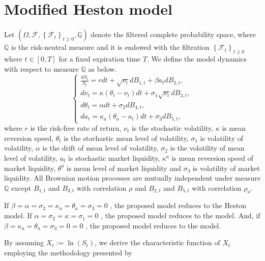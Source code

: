\documentclass[twoside]{article}
\begin{document}
\section{Modified Heston model}
Let $ \left( \Omega , \mathcal{F} , \left\lbrace \mathcal{F}_t\right\rbrace _{t \geq 0} , \mathbb{Q} \right) $ denote the filtered complete probability space, 
where $ \mathbb{Q} $ is the risk-neutral measure and it is endowed with the filtration $ \left\lbrace \mathcal{F}_t\right\rbrace _{t \geq 0} $ where $t \in 
\left[ 0 , T \right] $ for a fixed expiration time $ T $. We define the model dynamics with respect to measure $ \mathbb{Q} $ as below.
%
\begin{equation}
\label{St under P with at and vt}
\left\{
\begin{array}{l}
\frac{dS_t}{S_{t}} = r dt +  \sqrt{\nu_t} dB_{1,t} + \beta a_t  dB_{2,t}, \\[5pt]
d\nu_t = \kappa (\theta_t - \nu_t) dt + \sigma_1 \sqrt{\nu_t} dB_{3,t}, \\[5pt]
d\theta_t = \alpha dt + \sigma_2  dB_{4,t}, \\[5pt]
da_t = \kappa_a (\theta_a - a_t) dt + \sigma _{3}  dB_{5,t}, 
\end{array}
\right.
\end{equation}
%
where $ r $ is the risk-free rate of return, $ \nu_t $ is the stochastic volatility, $ \kappa $ is mean reversion speed, $ \theta_t $ is the stochastic mean level 
of volatility, $ \sigma_1 $ is volatility of volatility, $ \alpha $ is the drift of mean level of volatility, $ \sigma_2 $ is the volatility of mean level of volatility, 
$ a_t $ is stochastic market liquidity, $ \kappa^a $ is mean reversion speed of market liquidity, $ \theta^a $ is mean level of market liquidity and 
$ \sigma_3 $ is volatility of market liquidity. All Brownian motion processes are mutually independent under measure $ \mathbb{Q} $ except $ B_{1,t} $ 
and $ B_{3,t} $ with correlation $ \rho $ and $ B_{2,t} $ and $ B_{5,t} $ with correlation $ \rho_a $. 
%
\begin{rem}\label{rm1}
If $ \beta=\alpha=\sigma_2=\kappa_a=\theta_a=\sigma _{3}=0 $ , the proposed model reduces to the Heston model. 
If $ \alpha=\sigma_2=\kappa=\sigma _{1}=0 $ , the proposed model reduces to the \cite{Feng:Hung:Wang:2014} model. And, if 
$ \beta=\kappa_a=\theta_a=\sigma _{3}=0=0 $ , the proposed model reduces to the \cite{He:Chen:2021} model.
\end{rem}
%
\noindent
By assuming $X_t := \ln(S_t)$, we derive the characteristic function of $X_t$ employing the methodology presented by \cite{Duffie:Pan:Singleton:2000} 
\end{document}
